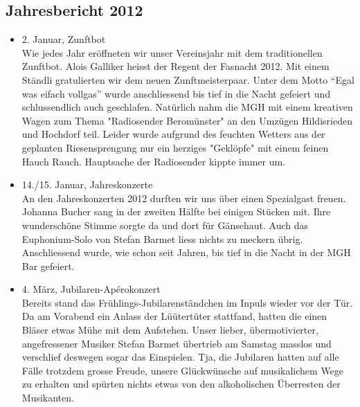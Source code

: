 \subsection{Jahresbericht 2012}
\begin{history}


    \begin{itemize}

        \item[]2. Januar, Zunftbot\\
        Wie jedes Jahr eröffneten wir unser Vereinsjahr mit dem traditionellen
        Zunftbot. Alois Galliker heisst der Regent der Fasnacht 2012. Mit einem
        Ständli gratulierten wir dem neuen Zunftmeisterpaar. Unter dem Motto
        \enquote{Egal was eifach vollgas} wurde anschliessend bis tief in die
        Nacht gefeiert und schlussendlich auch geschlafen. Natürlich nahm die
        MGH mit einem kreativen Wagen zum Thema "Radiosender Beromünster" an den
        Umzügen Hildisrieden und Hochdorf teil. Leider wurde aufgrund des
        feuchten Wetters aus der geplanten Riesensprengung nur ein herziges
        "Geklöpfe" mit einem feinen Hauch Rauch. Hauptsache der Radiosender
        kippte immer um.

        \item[]14./15. Januar, Jahreskonzerte\\
        An den Jahreskonzerten 2012 durften wir uns über einen Spezialgast
        freuen. Johanna Bucher sang in der zweiten Hälfte bei einigen Stücken
        mit. Ihre wunderschöne Stimme sorgte da und dort für Gänsehaut. Auch das
        Euphonium-Solo von Stefan Barmet liess nichts zu meckern übrig.
        Anschliessend wurde, wie schon seit Jahren, bis tief in die Nacht in der
        MGH Bar gefeiert.

        \item[]4. März, Jubilaren-Apérokonzert\\
        Bereits stand das Frühlings-Jubilarenständchen im Inpuls wieder vor der
        Tür. Da am Vorabend ein Anlass der Lüütertüter stattfand, hatten die
        einen Bläser etwas Mühe mit dem Aufstehen. Unser lieber,
        übermotivierter, angefressener Musiker Stefan Barmet übertrieb am
        Samstag masslos und verschlief deswegen sogar das Einspielen. Tja, die
        Jubilaren hatten auf alle Fälle trotzdem grosse Freude, unsere
        Glückwünsche auf musikalichem Wege zu erhalten und spürten nichts etwas
        von den alkoholischen Überresten der Musikanten.


\end{itemize}
\end{history}
